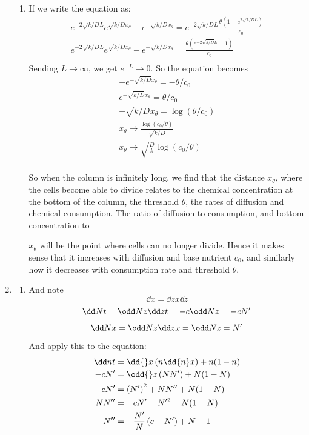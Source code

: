 \documentclass{X:/Documents/Coding/Latex/myassignment}
\begin{document}
\begin{enumerate}
\begin{enumerate}
		\item If we write the equation as:
		\begin{align*}
		e^{-2\sqrt{k/D} L} e^{\sqrt{k/D} x_\theta} - e^{-\sqrt{k/D} x_\theta} = e^{-2\sqrt{k/D} L} \frac{\theta (1 -e^{2\sqrt{k/D} L})}{c_0}\\		
		e^{-2\sqrt{k/D} L} e^{\sqrt{k/D} x_\theta} - e^{-\sqrt{k/D} x_\theta} =  \frac{\theta (e^{-2\sqrt{k/D} L} - 1)}{c_0}\\		
		\end{align*}
		Sending $L \to \infty$, we get $e^{-L} \to 0$. So the equation becomes
		\begin{align*}
			-e^{-\sqrt{k/D} x_\theta} = -\theta/c_0\\
			e^{-\sqrt{k/D} x_\theta} = \theta/c_0\\
			-\sqrt{k/D}x_\theta = \log(\theta/c_0)\\
			x_\theta \to \frac{\log(c_0/\theta)}{\sqrt{k/D}}\\
			x_\theta \to \sqrt{\frac{D}{k}}\log(c_0/\theta)\\
		\end{align*}

		So when the column is infinitely long, we find that the distance $x_\theta$, where the cells become able to divide relates to the chemical concentration at the bottom of the column, the threshold $\theta$, the rates of diffusion and chemical consumption.  The ratio of diffusion to consumption, and bottom concentration to 

		$x_{\theta}$ will be the point where cells can no longer divide. Hence it makes sense that it increases with diffusion and base nutrient $c_0$, and similarly how it decreases with consumption rate and threshold $\theta$.

	\end{enumerate}
	\item 
	\begin{enumerate}
		\item 
		And note
		\[\dd{}x = \dd{z}{x} \dd{}z\]
		\[\dd Nt = \odd Nz \dd z t = -c\odd Nz = -cN'  \]
		\[\dd Nx = \odd Nz \dd z x = \odd Nz = N'\]
		And apply this to the equation:
		\begin{align*}
		\dd nt &= \dd{}x\left(n\dd{n}x\right) +  n(1-n)\\
		-c N' &= \odd{}z\left(NN'\right) + N(1-N)\\
		-c N' &= \left(N' \right)^2 + N N'' + N(1-N)\\
		N N'' &= -cN' - N'^2  - N(1-N)\\
		N'' &= -\frac{N'}{N} \left(c + N'\right) + N-1
		\end{align*}
		


\end{enumerate}
\end{enumerate}
\end{document}

